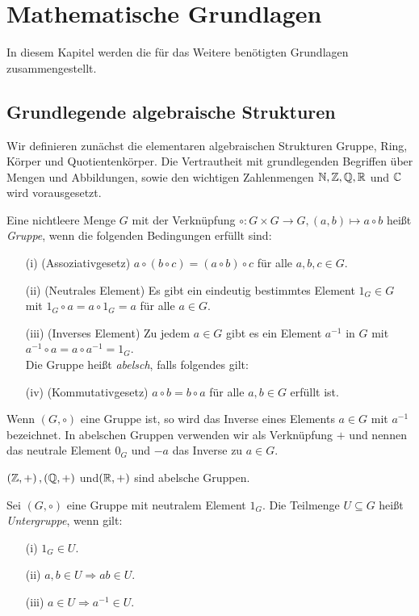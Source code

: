 \chapter{Mathematische Grundlagen}
In diesem Kapitel werden die für das Weitere benötigten Grundlagen zusammengestellt. 
\section{Grundlegende algebraische Strukturen}
Wir definieren zunächst die elementaren algebraischen Strukturen Gruppe, Ring, Körper und Quotientenkörper. Die Vertrautheit mit grundlegenden Begriffen über Mengen und Abbildungen, sowie den wichtigen Zahlenmengen $\mathbb{N}, \mathbb{Z}, \mathbb{Q}, \mathbb{R}$ und $\mathbb{C}$ wird vorausgesetzt. 
%
\begin{defn}\label{Gruppe}
Eine nichtleere Menge $G$ mit der Verknüpfung $\circ \colon G \times G \rightarrow G, \left( a, b\right) \mapsto a \circ b$ heißt \textit{Gruppe}, wenn die folgenden Bedingungen erfüllt sind:
\begin{enumerate}
\item[(i)] (Assoziativgesetz) $a\circ \left(b\circ c\right) = \left(a\circ b\right) \circ c$ für alle $a, b, c \in G$.
\item[(ii)] (Neutrales Element) Es gibt ein eindeutig bestimmtes Element $1_G \in G$ mit $1_G \circ a  = a \circ 1_G = a$ für alle $a \in G$.
\item[(iii)] (Inverses Element) Zu jedem $a \in G$ gibt es ein Element $a^{-1}$ in $G$ mit $a^{-1} \circ a = a \circ a^{-1} = 1_G$. \\
Die Gruppe heißt \textit{abelsch}, falls folgendes gilt: 
\item[(iv)] (Kommutativgesetz) $a \circ b = b \circ a$ für alle $a, b \in G$ erfüllt ist.  
\end{enumerate} 
\end{defn}
%
%
\begin{bem}
Wenn $\left(G, \circ\right)$ eine Gruppe ist, so wird das Inverse eines Elements $a\in G$ mit $a^{-1}$ bezeichnet. In abelschen Gruppen verwenden wir als Verknüpfung $+$ und nennen das neutrale Element $0_G$ und $-a$ das Inverse zu $a\in G$. 
\end{bem}
%
\begin{bsp}
$\left( \mathbb{Z}, +\right), \left(\mathbb{Q}, +\right)$ und$\left(\mathbb{R}, +\right)$ sind abelsche Gruppen. 
\end{bsp}
%
\begin{defn}\label{Untergruppe}
Sei $\left(G, \circ\right)$ eine Gruppe mit neutralem Element $1_G$. Die Teilmenge $U\subseteq G$ heißt \textit{Untergruppe}, wenn gilt:
\begin{enumerate}
\item[(i)] $1_G \in U$.
\item[(ii)] $a, b \in U \Rightarrow ab \in U$.
\item[(iii)] $a \in U \Rightarrow a^{-1} \in U$.
\end{enumerate} 
\end{defn}


